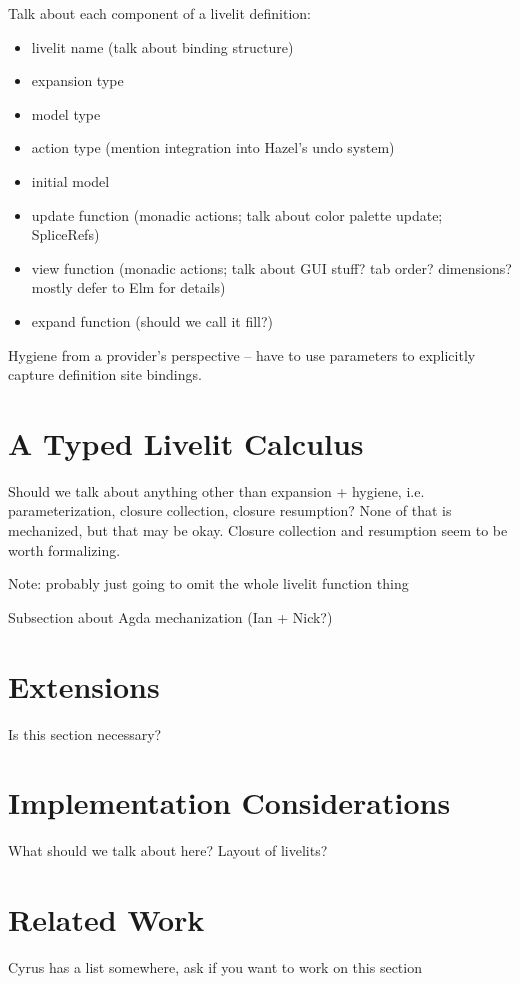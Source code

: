 Talk about each component of a livelit definition:
\begin{itemize}
  \item livelit name (talk about binding structure)
  \item expansion type
  \item model type
  \item action type (mention integration into Hazel's undo system)
  \item initial model
  \item update function (monadic actions; talk about color palette update; SpliceRefs)
  \item view function (monadic actions; talk about GUI stuff? tab order? dimensions? mostly defer to Elm for details)
  \item expand function (should we call it fill?)
\end{itemize}

Hygiene from a provider's perspective -- have to use parameters to explicitly capture definition site bindings.


\section{A Typed Livelit Calculus}
Should we talk about anything other than expansion + hygiene, i.e. parameterization, closure collection, closure resumption?
None of that is mechanized, but that may be okay. Closure collection and resumption seem to be worth formalizing.

Note: probably just going to omit the whole livelit function thing

Subsection about Agda mechanization (Ian + Nick?)

\section{Extensions}
Is this section necessary?

\section{Implementation Considerations}
What should we talk about here? Layout of livelits? 

\section{Related Work}
Cyrus has a list somewhere, ask if you want to work on this section

